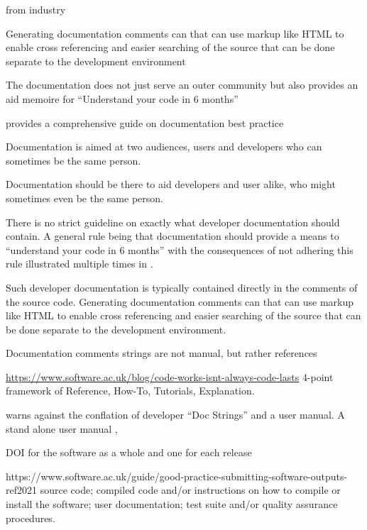 from industry \cite{google_documentation_2025}

Generating documentation comments can that can use markup like HTML to enable cross referencing and easier searching of the source that can be done separate to the development environment

The documentation does not just serve an outer community but also provides an aid memoire for
``Understand your code in 6 months'' \cite{writethedocs_sowftware_2025} 


\textcite{writethedocs_sowftware_2025} provides a comprehensive guide on documentation best practice

Documentation is aimed at two audiences, users and developers who can sometimes be the same person.

Documentation should be there to aid developers and user alike, who might sometimes even be the same person.

There is no strict guideline on exactly what developer documentation should contain. A general rule being that documentation should provide a means to ``understand your code in 6 months'' \cite{writethedocs_sowftware_2025} with the consequences of not adhering this rule illustrated multiple times in \textcite{perkel_challenge_2020}.

Such developer documentation is typically contained directly in the comments of the source code. Generating documentation comments can that can use markup like HTML to enable cross referencing and easier searching of the source that can be done separate to the development environment.


Documentation comments strings are not manual, but rather references 

\url{https://www.software.ac.uk/blog/code-works-isnt-always-code-lasts}
\cite{procida_diataxis_2025} 4-point framework of Reference, How-To, Tutorials, Explanation.

\cite[Section 6.2]{stallman_gnu_1992} warns against the conflation of developer ``Doc Strings'' and a user manual. A stand alone user manual \cite{lehoucq_arpack_1998, },


DOI for the software as a whole and one for each release \cite{smith_software_2016}


https://www.software.ac.uk/guide/good-practice-submitting-software-outputs-ref2021
source code;
compiled code and/or instructions on how to compile or install the software;
user documentation;
test suite and/or quality assurance procedures.

